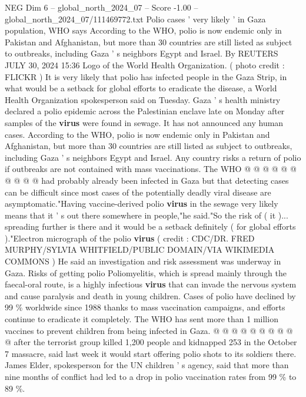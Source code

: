 \begin{textsample}{NEG Dim 6 – global\_north\_2024\_07 – Score -1.00 – global\_north\_2024\_07/111469772.txt}  \label{ex:f6_neg_221}
Polio cases ' very likely ' in Gaza population, WHO says According to the WHO, polio is now endemic only in Pakistan and Afghanistan, but more than 30 countries are still listed as subject to outbreaks, including Gaza ' s neighbors Egypt and Israel.
By REUTERS JULY 30, 2024 15:36 Logo of the World Health Organization. ( photo credit : FLICKR ) It is very likely that polio has infected people in the Gaza Strip, in what would be a setback for global efforts to eradicate the disease, a World Health Organization spokesperson said on Tuesday.
Gaza ' s health ministry declared a polio epidemic across the Palestinian enclave late on Monday after samples of the \textbf{virus} were found in sewage.
It has not announced any human cases.
According to the WHO, polio is now endemic only in Pakistan and Afghanistan, but more than 30 countries are still listed as subject to outbreaks, including Gaza ' s neighbors Egypt and Israel.
Any country risks a return of polio if outbreaks are not contained with mass vaccinations.
The WHO @ @ @ @ @ @ @ @ @ @ had probably already been infected in Gaza but that detecting cases can be difficult since most cases of the potentially deadly viral disease are asymptomatic."Having vaccine-derived polio \textbf{virus} in the sewage very likely means that it ' s out there somewhere in people,"he said."So the risk of ( it )... spreading further is there and it would be a setback definitely ( for global efforts )."Electron micrograph of the polio \textbf{virus} ( credit : CDC/DR.
FRED MURPHY/SYLVIA WHITFIELD/PUBLIC DOMAIN/VIA WIKIMEDIA COMMONS ) He said an investigation and risk assessment was underway in Gaza.
Risks of getting polio Poliomyelitis, which is spread mainly through the faecal-oral route, is a highly infectious \textbf{virus} that can invade the nervous system and cause paralysis and death in young children.
Cases of polio have declined by 99 \% worldwide since 1988 thanks to mass vaccination campaigns, and efforts continue to eradicate it completely.
The WHO has sent more than 1 million vaccines to prevent children from being infected in Gaza. @ @ @ @ @ @ @ @ @ @ after the terrorist group killed 1,200 people and kidnapped 253 in the October 7 massacre, said last week it would start offering polio shots to its soldiers there.
James Elder, spokesperson for the UN children ' s agency, said that more than nine months of conflict had led to a drop in polio vaccination rates from 99 \% to 89 \%.

\end{textsample}
